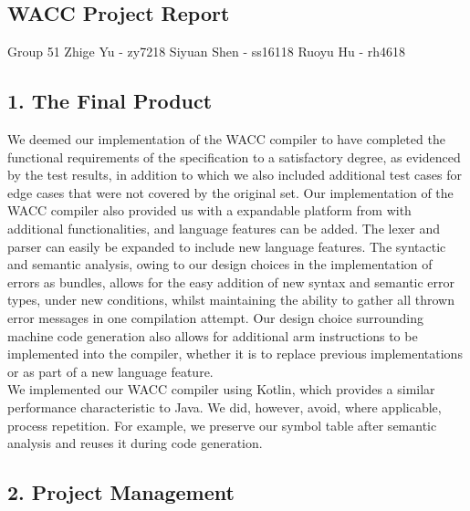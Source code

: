\documentclass[10pt,a4paper]{report}
\begin{document}
  \begin{center}
    \section*{WACC Project Report}    
    Group 51  Zhige Yu - zy7218  Siyuan Shen - ss16118  Ruoyu Hu - rh4618
  \end{center}

  \subsection*{1. The Final Product}

  We deemed our implementation of the WACC compiler to have completed the
  functional requirements of the specification to a satisfactory degree, as
  evidenced by the test results, in addition to which we also included
  additional test cases for edge cases that were not covered by the original set.
  Our implementation of the WACC compiler also provided us with a expandable
  platform from with additional functionalities, and language features can be
  added. The lexer and parser can easily be expanded to include new language
  features. The syntactic and semantic analysis, owing to our design choices in
  the implementation of errors as bundles, allows for the easy addition of new
  syntax and semantic error types, under new conditions, whilst maintaining the
  ability to gather all thrown error messages in one compilation attempt.
  Our design choice surrounding machine code generation also allows for
  additional arm instructions to be implemented into the compiler, whether it is
  to replace previous implementations or as part of a new language feature.\\
  We implemented our WACC compiler using Kotlin, which provides a similar
  performance characteristic to Java. We did, however, avoid, where applicable,
  process repetition. For example, we preserve our symbol table after semantic
  analysis and reuses it during code generation.


  \subsection*{2. Project Management}
\end{document}
